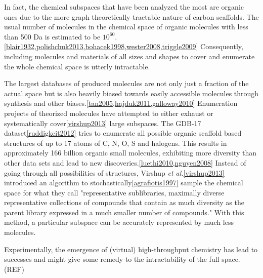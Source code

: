 \documentclass{article}
\begin{document}


In fact, the chemical subspaces that have been analyzed the most are organic ones due to the more graph theoretically tractable nature of carbon scaffolds. The usual number of molecules in the chemical space of organic molecules with less than 500 Da is estimated to be $10^{60}$.\ref{blair1932,polishchuk2013,bohacek1998,wester2008,triggle2009} Consequently,  including molecules and materials of all sizes and shapes to cover and enumerate the whole chemical space is utterly intractable.
 
The largest databases of produced molecules are not only just a fraction of the actual space but is also heavily biased towards easily accessible molecules through synthesis and other biases.\ref{tan2005,hajduk2011,galloway2010} Enumeration projects of theorized molecules have attempted to either exhaust or systematically cover\ref{virshup2013} large subspaces. The GDB-17 dataset\ref{ruddigkeit2012} tries to enumerate all possible organic scaffold based structures of up to 17 atoms of C, N, O, S and halogens. This results in approximately 166 billion organic small molecules, exhibiting more diversity than other data sets and lead to new discoveries.\ref{luethi2010,nguyen2008} Instead of going through all possibilities of structures, Virshup \textit{et al.}\ref{virshup2013} introduced an algorithm to stochastically\ref{agrafiotis1997} sample the chemical space for what they call "representative sublibraries, maximally diverse representative collections of compounds that contain as much diversity as the parent library expressed in a much smaller number of compounds." With this method, a particular subspace can be accurately represented by much less molecules.

Experimentally, the emergence of (virtual) high-throughput chemistry has lead to successes and might give some remedy to the intractability of the full space.(REF) 
\end{document}
